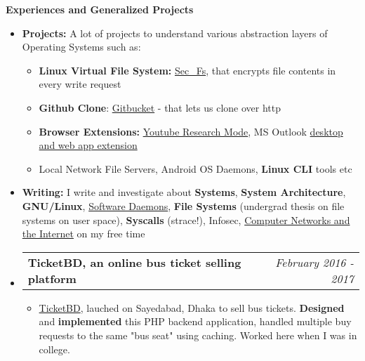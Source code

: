 \documentclass[legalpaper,10pt]{article}
\makeatletter
\newcommand{\resheading}[1]{{\large \colorbox{mygrey}{\begin{minipage}{\textwidth}{\textbf{#1 \vphantom{p\^{E}}}}\end{minipage}}}}
\newcommand{\ressubheading}[4]{
	\begin{tabular*}{7.1in}{l@{\extracolsep{\fill}}r}
		\textbf{#1} & \textit{#4} \\
	\end{tabular*}\vspace{-6pt}}
\makeatother
\begin{document}
	\vspace{0.20in}
	
	\resheading{Experiences and Generalized Projects}
	\begin{itemize}  
    	 \item \textbf{Projects:} A lot of projects to understand various abstraction layers of Operating Systems such as:
    	    \begin{itemize}
    	        \item \textbf{Linux Virtual File System:}         \href{https://github.com/ovebepari/sec\_fs}{Sec\_Fs}, that encrypts file contents in every write request
    	        \item \textbf{Github Clone}: \href{https://github.com/ovebepari/Github_Clone}{Gitbucket} - that lets us clone over http
    	        \item \textbf{Browser Extensions:} \href{https://github.com/ovebepari/Youtube-Research-Mode}{Youtube Research Mode}, MS Outlook \href{https://github.com/ovebepari/PhishMe}{desktop and web app extension}
    	        \item Local Network File Servers, Android OS Daemons, \textbf{Linux CLI} tools etc
    	    \end{itemize}
		
    	\vspace{0.03in}

		\item \textbf{Writing:} I write and investigate about \textbf{Systems}, \textbf{System Architecture}, \textbf{GNU/Linux}, \href{https://ovebepari.github.io/linux\%7Csystems/docker-socket-tale/}{Software Daemons}, \textbf{File Systems} (undergrad thesis on file systems on user space), \textbf{Syscalls} (strace!), Infosec, \href{https://ovebepari.github.io/Computer-Networking-Series/}{Computer Networks and the Internet} on my free time
		
		\vspace{0.03in}
		\item \ressubheading{TicketBD, an online bus ticket selling platform}{}{}{February 2016 - 2017}
		\begin{itemize} 
			\item \href{https://www.facebook.com/ticketbd.online}{TicketBD}, lauched on Sayedabad, Dhaka to sell bus tickets. \textbf{Designed} and \textbf{implemented} this PHP backend application, handled multiple buy requests to the same "bus seat" using caching. Worked here when I was in college.
		\end{itemize}

	\end{itemize}
\end{document}
